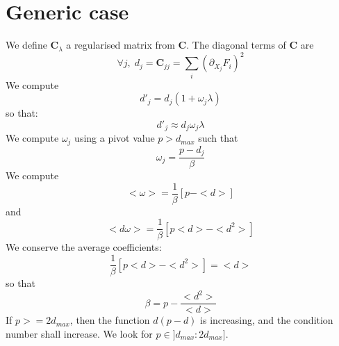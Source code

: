 \documentclass[aps,12pt]{revtex4}
\begin{document}
\section{Generic case}
We define $\bm{C}_\lambda$ a regularised matrix from $\bm{C}$.
The diagonal terms of $\bm{C}$ are
\begin{equation}
	\forall j, \; d_j = \bm{C}_{jj} = \sum_i \left(\partial_{X_j} F_i\right)^2
\end{equation}
We compute
\begin{equation}
	d'_j = d_j (1+\omega_j \lambda)
\end{equation}
so that:
\begin{equation}
	d'_j \approx d_j \omega_j \lambda
\end{equation}
We compute $\omega_j$ using a pivot value $p>d_{max}$ such that
\begin{equation}
	\omega_j = \dfrac{p-d_j}{\beta}
\end{equation}
 We compute
\begin{equation}
	<\omega> = \dfrac{1}{\beta}\left[p-<d>\right]
\end{equation}
and
\begin{equation}
	<d\omega> = \dfrac{1}{\beta} \left[ p <d> - <d^2>\right]
\end{equation}
We conserve the average coefficients:
\begin{equation}
	\dfrac{1}{\beta} \left[ p <d> - <d^2>\right] = <d>
\end{equation}
 so that
 \begin{equation}
 	\beta = p - \dfrac{<d^2>}{<d>}
 \end{equation}
 If $p>=2d_{max}$, then the function $d(p-d)$ is increasing, and the condition number shall increase. We look
 for $p\in\rbrack d_{max}:2d_{max}\rbrack$.
 
\end{document}

